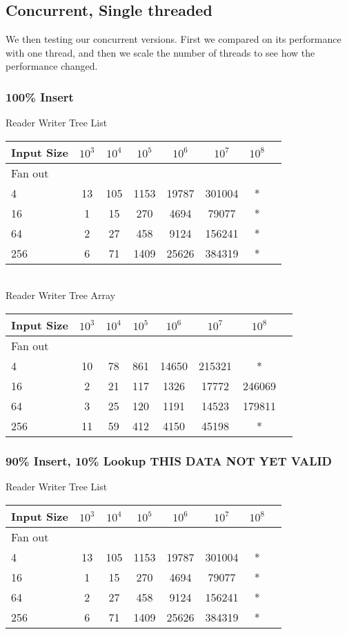 \documentclass{sig-alternate}
\begin{document}
\subsection{Concurrent, Single threaded}
We then testing our concurrent versions.
First we compared on its performance with one thread, and then we scale the number of threads to see how the performance changed.

\subsubsection{100\% Insert}
Reader Writer Tree List \\
\begin{tabular}{| l | c | c | c | c | c | c | r}
  \hline
  Input Size & $10^3$ & $10^4$ & $10^5$ & $10^6$ & $10^7$ & $10^8$ \\ \hline
  Fan out & & & & & &  \\  \hline
  4			&	13 & 105 & 1153 & 19787 & 301004 & * \\
  16		&	1 & 15 & 270 & 4694 & 79077 & * \\
  64		&	2 & 27 & 458 & 9124 & 156241 & * \\
  256		&	6 & 71 & 1409 & 25626 & 384319 & * \\
  \hline
\end{tabular} \\

Reader Writer Tree Array \\
\begin{tabular}{| l | c | c | c | c | c | c | r}
  \hline
  Input Size & $10^3$ & $10^4$ & $10^5$ & $10^6$ & $10^7$ & $10^8$ \\ \hline
  Fan out & & & & & &  \\  \hline
  4			&	10 & 78 & 861 & 14650 & 215321 & * \\
  16		&	2 & 21 & 117 & 1326 & 17772 & 246069 \\
  64		&	3 & 25 & 120 & 1191 & 14523 & 179811 \\
  256		&	11 & 59 & 412 & 4150 & 45198 & * \\
  \hline
\end{tabular} 


\subsubsection{90\% Insert, 10\% Lookup  THIS DATA NOT YET VALID}
Reader Writer Tree List \\
\begin{tabular}{| l | c | c | c | c | c | c | r}
  \hline
  Input Size & $10^3$ & $10^4$ & $10^5$ & $10^6$ & $10^7$ & $10^8$ \\ \hline
  Fan out & & & & & &  \\  \hline
  4			&	13 & 105 & 1153 & 19787 & 301004 & * \\
  16		&	1 & 15 & 270 & 4694 & 79077 & * \\
  64		&	2 & 27 & 458 & 9124 & 156241 & * \\
  256		&	6 & 71 & 1409 & 25626 & 384319 & * \\
  \hline
\end{tabular} \\
\end{document}
